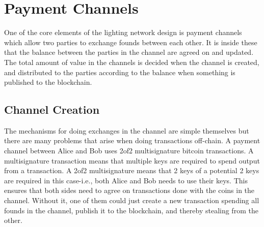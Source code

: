 \documentclass[informationsecurity]{gucmasterproject}
\begin{document}

\chapter{Payment Channels}

\cite{decker2015fast}

One of the core elements of the lighting network design is payment channels which allow two parties to exchange founds between each other.
It is inside these that the balance between the parties in the channel are agreed on and updated.
The total amount of value in the channels is decided when the channel is created, and distributed to the parties according to the balance when something is published to the blockchain.

\section{Channel Creation}
The mechanisms for doing exchanges in the channel are simple themselves but there are many problems that arise when doing transactions off-chain.
A payment channel between Alice and Bob uses 2of2 multisignature bitcoin transactions. A multisignature transaction means that multiple keys are required to spend output from a transaction. A 2of2 multisignature means that 2 keys of a potential 2 keys are required in this case-i.e., both Alice and Bob needs to use their keys. This ensures that both sides need to agree on transactions done with the coins in the channel. Without it, one of them could just create a new transaction spending all founds in the channel, publish it to the blockchain, and thereby stealing from the other.
\end{document}
